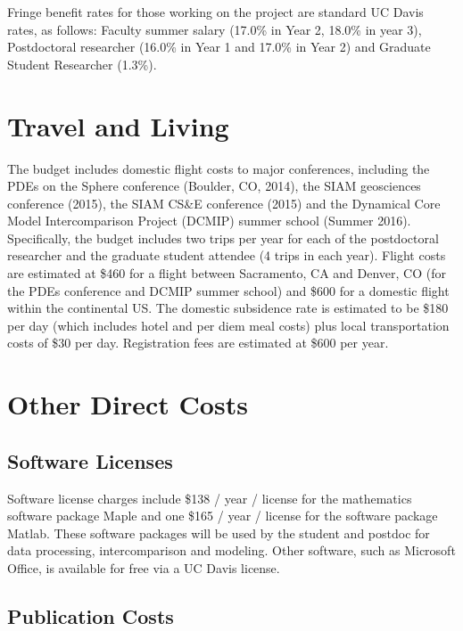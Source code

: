 \documentclass[11pt]{article}
\begin{document}
Fringe benefit rates for those working on the project are standard UC Davis rates, as follows:  Faculty summer salary (17.0\% in Year 2, 18.0\% in year 3), Postdoctoral researcher (16.0\% in Year 1 and 17.0\% in Year 2) and Graduate Student Researcher (1.3\%).

\section{Travel and Living}
\vspace{-0.3cm}

The budget includes domestic flight costs to major conferences, including the PDEs on the Sphere conference (Boulder, CO, 2014), the SIAM geosciences conference (2015), the SIAM CS\&E conference (2015) and the Dynamical Core Model Intercomparison Project (DCMIP) summer school (Summer 2016).  Specifically, the budget includes two trips per year for each of the postdoctoral researcher and the graduate student attendee (4 trips in each year).  Flight costs are estimated at \$460 for a flight between Sacramento, CA and Denver, CO (for the PDEs conference and DCMIP summer school) and \$600 for a domestic flight within the continental US.  The domestic subsidence rate is estimated to be \$180 per day (which includes hotel and per diem meal costs) plus local transportation costs of \$30 per day.  Registration fees are estimated at \$600 per year.

\section{Other Direct Costs}
\vspace{-0.3cm}

\subsection{Software Licenses}

Software license charges include \$138 / year / license for the mathematics software package Maple and one \$165 / year / license for the software package Matlab.  These software packages will be used by the student and postdoc for data processing, intercomparison and modeling.  Other software, such as Microsoft Office, is available for free via a UC Davis license.

\subsection{Publication Costs}
\end{document}
